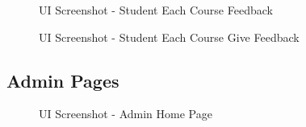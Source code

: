 \begin{figure}[H]
    \centering
    \caption{UI Screenshot - Student Each Course Feedback}
    \label{fig:ss_s_each_course_feedbacks}
\end{figure}

\begin{figure}[H]
    \centering
    \caption{UI Screenshot - Student Each Course Give Feedback}
    \label{fig:ss_s_each_course_give_feedback}
\end{figure}

\subsection{Admin Pages}
\begin{figure}[H]
    \centering
    \caption{UI Screenshot - Admin Home Page}
    \label{fig:ss_a_home}
\end{figure}

